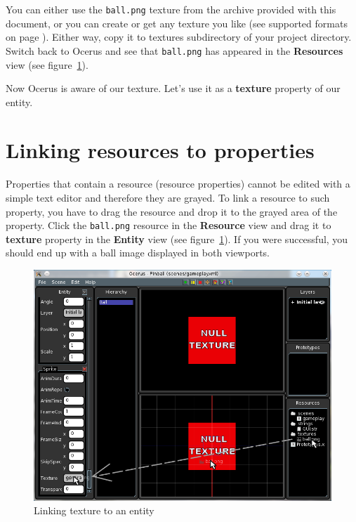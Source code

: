 \documentclass[a4paper,12pt]{article}
\begin{document}
You can either use the \texttt{ball.png} texture from the archive provided with this document, or you can create or get any texture you like (see supported formats on page \pageref{sec:supported_formats}). Either way, copy it to textures subdirectory of your project directory. Switch back to Ocerus and see that \texttt{ball.png} has appeared in the \textbf{Resources} view (see figure~\ref{fig:link_texture}).

Now Ocerus is aware of our texture. Let's use it as a \textbf{texture} property of our entity.

\section{Linking resources to properties}
Properties that contain a resource (resource properties) cannot be edited with a simple text editor and therefore they are grayed. To link a resource to such property, you have to drag the resource and drop it to the grayed area of the property. Click the \texttt{ball.png} resource in the \textbf{Resource} view and drag it to \textbf{texture} property in the \textbf{Entity} view (see figure~\ref{fig:link_texture}). If you were successful, you should end up with a ball image displayed in both viewports.

\begin{figure}[ht]
 \begin{center}
  \includegraphics[width=\textwidth]{LinkTexture}
 \end{center}
 \caption{Linking texture to an entity}
 \label{fig:link_texture}
\end{figure}
\end{document}
